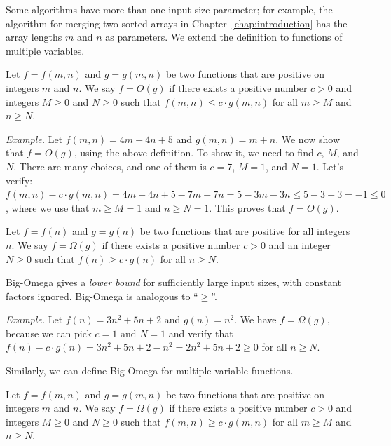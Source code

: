 Some algorithms have more than one input-size parameter; for example,
the algorithm for merging two sorted arrays in Chapter~\ref{chap:introduction}
has the array lengths $m$ and $n$ as parameters.
We extend the definition to functions of multiple variables.

\begin{definition}[Big-O]
Let $f = f(m,n)$ and $g=g(m,n)$ be two functions that are positive on integers $m$ and $n$.
We say $f = O(g)$ if there exists a positive number $c > 0$ and integers $M\ge 0$ and $N \ge 0$
such that $f(m,n) \le c\cdot g(m,n)$ for all $m\ge M$ and $n\ge N$.
\end{definition}


\emph{Example.} Let $f(m,n) = 4m + 4n + 5$ and $g(m,n) = m + n$. We now show that $f = O(g)$,
using the above definition. To show it, we need to find $c$, $M$, and $N$.
There are many choices, and one of them is $c = 7$, $M = 1$, and $N = 1$.
Let's verify: $f(m,n) - c\cdot g(m,n) = 4m + 4n + 5 - 7m - 7n = 5 - 3m - 3n \le 5 - 3 - 3 = -1 \le 0$,
where we use that $m \ge M = 1$ and $n \ge N = 1$. This proves that $f = O(g)$.

\begin{definition}
Let $f = f(n)$ and $g=g(n)$ be two functions that are positive for all integers $n$.
We say $f = \Omega(g)$ if there exists a positive number $c > 0$ and an integer $N \ge 0$
such that $f(n) \ge c\cdot g(n)$ for all $n\ge N$.
\end{definition}

Big-Omega gives a \emph{lower bound} for sufficiently large input sizes, with constant factors ignored.
Big-Omega is analogous to ``$\ge$''.

\emph{Example.} Let $f(n) = 3n^2+5n+2$ and $g(n) = n^2$.
We have $f = \Omega(g)$, because we can pick $c = 1$ and $N =1$ and verify that
$f(n) - c\cdot g(n) = 3n^2+5n+2- n^2 = 2n^2 + 5n+2\ge 0$ for all $n\ge N$.

Similarly, we can define Big-Omega for multiple-variable functions.

\begin{definition}
Let $f = f(m,n)$ and $g=g(m,n)$ be two functions that are positive on integers $m$ and $n$.
We say $f = \Omega(g)$ if there exists a positive number $c > 0$ and integers $M\ge 0$ and $N \ge 0$
such that $f(m,n) \ge c\cdot g(m,n)$ for all $m\ge M$ and $n\ge N$.
\end{definition}

